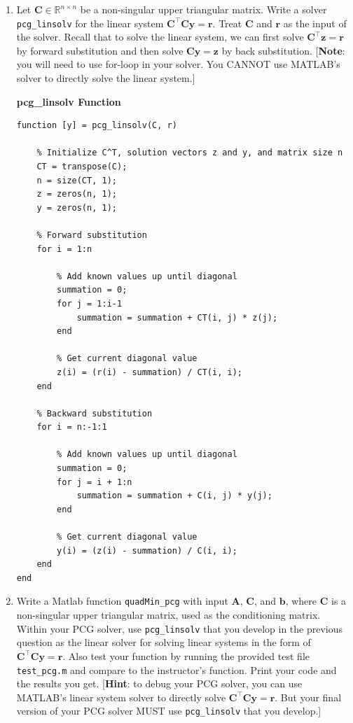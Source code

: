 \documentclass[12pt]{article}
\newcommand{\vb}{{\mathbf{b}}}
\newcommand{\vr}{{\mathbf{r}}}
\newcommand{\vy}{{\mathbf{y}}}
\newcommand{\vz}{{\mathbf{z}}}
\newcommand{\vA}{{\mathbf{A}}}
\newcommand{\vC}{{\mathbf{C}}}
\newcommand{\RR}{\mathbb{R}}
\begin{document}
\begin{enumerate}
\item Let $\vC\in \RR^{n\times n}$ be a non-singular upper triangular matrix. Write a solver \verb|pcg_linsolv| for the linear system $\vC^\top \vC \vy = \vr$. Treat $\vC$ and $\vr$ as the input of the solver. Recall that to solve the linear system, we can first solve $\vC^\top\vz = \vr$ by forward substitution and then solve $\vC\vy = \vz$ by back substitution. [\textbf{Note}: you will need to use for-loop in your solver. You CANNOT use MATLAB's solver to directly solve the linear system.]

\vspace{8mm}

\noindent \textbf{pcg\_linsolv Function}
\vspace{4mm}
\begin{verbatim}
function [y] = pcg_linsolv(C, r)

    % Initialize C^T, solution vectors z and y, and matrix size n
    CT = transpose(C);
    n = size(CT, 1);
    z = zeros(n, 1);
    y = zeros(n, 1);

    % Forward substitution
    for i = 1:n

        % Add known values up until diagonal
        summation = 0;
        for j = 1:i-1
            summation = summation + CT(i, j) * z(j);
        end

        % Get current diagonal value
        z(i) = (r(i) - summation) / CT(i, i);
    end

    % Backward substitution
    for i = n:-1:1

        % Add known values up until diagonal
        summation = 0;
        for j = i + 1:n
            summation = summation + C(i, j) * y(j);
        end

        % Get current diagonal value
        y(i) = (z(i) - summation) / C(i, i);
    end
end
\end{verbatim}

\newpage

\item Write a Matlab function \verb|quadMin_pcg| with input $\vA$, $\vC$, and $\vb$, where $\vC$ is a non-singular upper triangular matrix, used as the conditioning matrix. Within your PCG solver, use \verb|pcg_linsolv| that you develop in the previous question as the linear solver for solving linear systems in the form of $\vC^\top \vC \vy = \vr$. Also test your function by running the provided test file \verb|test_pcg.m| and compare to the instructor's function. Print your code and the results you get. [\textbf{Hint}: to debug your PCG solver, you can use MATLAB's linear system solver to directly solve $\vC^\top \vC \vy = \vr$. But your final version of your PCG solver MUST use \verb|pcg_linsolv| that you develop.]

\end{enumerate}
\end{document}
